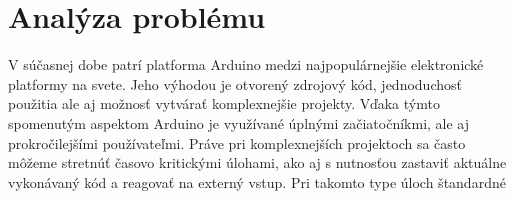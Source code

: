 \section{Analýza problému}
V súčasnej dobe patrí platforma Arduino medzi najpopulárnejšie elektronické platformy na svete. Jeho výhodou je otvorený zdrojový kód, jednoduchosť použitia ale aj možnosť vytvárať komplexnejšie projekty. Vďaka týmto spomenutým aspektom Arduino je využívané úplnými začiatočníkmi, ale aj prokročilejšími používateľmi. Práve pri komplexnejších projektoch sa často môžeme stretnúť časovo kritickými úlohami, ako aj s nutnosťou zastaviť aktuálne vykonávaný kód a reagovať na externý vstup. Pri takomto type úloch štandardné